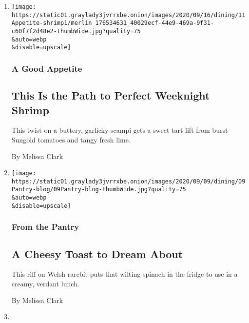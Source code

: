 \begin{enumerate}
\def\labelenumi{\arabic{enumi}.}
\item
  \href{/2020/09/11/dining/shrimp-scampi-recipe.html}{}

  \texttt{[image: https://static01.graylady3jvrrxbe.onion/images/2020/09/16/dining/11Appetite-shrimp1/merlin\_176534631\_40029ecf-44e9-469a-9f31-c60f7f2d48e2-thumbWide.jpg?quality=75\\\&auto=webp\\\&disable=upscale]}

  \hypertarget{a-good-appetite}{%
  \subsubsection{A Good Appetite}\label{a-good-appetite}}

  \hypertarget{this-is-the-path-to-perfect-weeknight-shrimp}{%
  \subsection{This Is the Path to Perfect Weeknight
  Shrimp}\label{this-is-the-path-to-perfect-weeknight-shrimp}}

  This twist on a buttery, garlicky scampi gets a sweet-tart lift from
  burst Sungold tomatoes and tangy fresh lime.

  By Melissa Clark
\item
  \href{/2020/09/09/dining/spinach-rarebit-recipe.html}{}

  \texttt{[image: https://static01.graylady3jvrrxbe.onion/images/2020/09/09/dining/09Pantry-blog/09Pantry-blog-thumbWide.jpg?quality=75\\\&auto=webp\\\&disable=upscale]}

  \hypertarget{from-the-pantry}{%
  \subsubsection{From the Pantry}\label{from-the-pantry}}

  \hypertarget{a-cheesy-toast-to-dream-about}{%
  \subsection{A Cheesy Toast to Dream
  About}\label{a-cheesy-toast-to-dream-about}}

  This riff on Welsh rarebit puts that wilting spinach in the fridge to
  use in a creamy, verdant lunch.

  By Melissa Clark
\item
  \href{/2020/09/04/dining/sheet-pan-chicken.html}{}


\end{enumerate}
